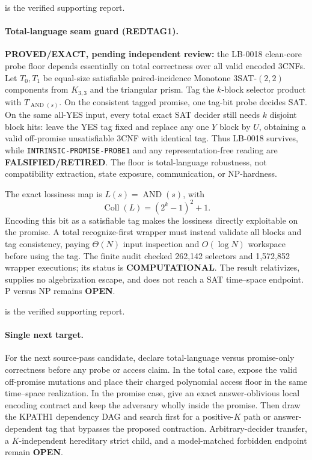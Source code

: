 \documentclass[11pt]{article}
\begin{document}
 is the verified supporting report.

\paragraph{Total-language seam guard (REDTAG1).}
\textbf{PROVED/EXACT, pending independent review:} the LB-0018 clean-core probe floor depends essentially on total correctness over all valid encoded \(3\)CNFs.  Let \(T_0,T_1\) be equal-size satisfiable paired-incidence Monotone \(3\)SAT-\((2,2)\) components from \(K_{3,3}\) and the triangular prism.  Tag the \(k\)-block selector product with \(T_{\operatorname{AND}(s)}\).  On the consistent tagged promise, one tag-bit probe decides SAT.  On the same all-YES input, every total exact SAT decider still needs \(k\) disjoint block hits: leave the YES tag fixed and replace any one \(Y\) block by \(U\), obtaining a valid off-promise unsatisfiable \(3\)CNF with identical tag.  Thus LB-0018 survives, while \texttt{INTRINSIC-PROMISE-PROBE1} and any representation-free reading are \textbf{FALSIFIED/RETIRED}.  The floor is total-language robustness, not compatibility extraction, state exposure, communication, or NP-hardness.

The exact lossiness map is \(L(s)=\operatorname{AND}(s)\), with
\[
 \operatorname{Coll}(L)=(2^k-1)^2+1.
\]
Encoding this bit as a satisfiable tag makes the lossiness directly exploitable on the promise.  A total recognize-first wrapper must instead validate all blocks and tag consistency, paying \(\Theta(N)\) input inspection and \(O(\log N)\) workspace before using the tag.  The finite audit checked 262,142 selectors and 1,572,852 wrapper executions; its status is \textbf{COMPUTATIONAL}.  The result relativizes, supplies no algebrization escape, and does not reach a SAT time--space endpoint.  P versus NP remains \textbf{OPEN}.

 is the verified supporting report.

\paragraph{Single next target.}
For the next source-pass candidate, declare total-language versus promise-only correctness before any probe or access claim.  In the total case, expose the valid off-promise mutations and place their charged polynomial access floor in the same time--space realization.  In the promise case, give an exact answer-oblivious local encoding contract and keep the adversary wholly inside the promise.  Then draw the KPATH1 dependency DAG and search first for a positive-\(K\) path or answer-dependent tag that bypasses the proposed contraction.  Arbitrary-decider transfer, a \(K\)-independent hereditary strict child, and a model-matched forbidden endpoint remain \textbf{OPEN}.
\end{document}
